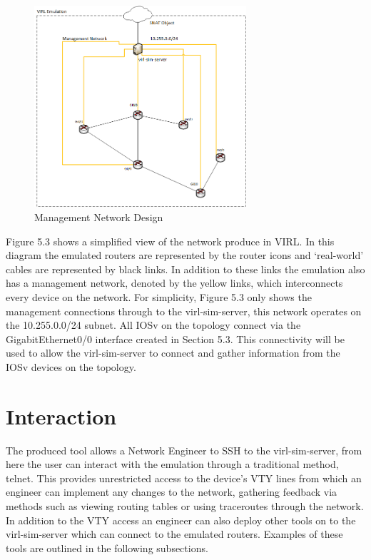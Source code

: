 \documentclass[11pt]{report}
\begin{document}
\begin{figure}[h!]
	\caption{Management Network Design}
	\centering
	\includegraphics[width=0.7\textwidth]{managementNet.png}
\end{figure}

Figure 5.3 shows a simplified view of the network produce in VIRL. In this diagram the emulated routers are represented by the router icons and `real-world' cables are represented by black links. In addition to these links the emulation also has a management network, denoted by the yellow links, which interconnects every device on the network. For simplicity, Figure 5.3 only shows the management connections through to the virl-sim-server, this network operates on the 10.255.0.0/24 subnet. All IOSv on the topology connect via the GigabitEthernet0/0 interface created in Section 5.3. This connectivity will be used to allow the virl-sim-server to connect and gather information from the IOSv devices on the topology.

\section{Interaction}

The produced tool allows a Network Engineer to SSH to the virl-sim-server, from here the user can interact with the emulation through a traditional method, telnet. This provides unrestricted access to the device's VTY lines from which an engineer can implement any changes to the network, gathering feedback via methods such as viewing routing tables or using traceroutes through the network. In addition to the VTY access an engineer can also deploy other tools on to the virl-sim-server which can connect to the emulated routers. Examples of these tools are outlined in the following subsections.
\end{document}
